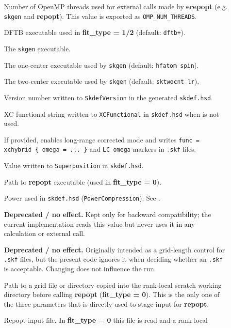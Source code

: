 \begin{description}
\item[] Number of OpenMP threads used for external calls made by \textbf{erepopt}
(e.g. \texttt{skgen} and \textbf{repopt}). This value is exported as \texttt{OMP\_NUM\_THREADS}.
\item[] DFTB executable used in \textbf{fit\_type = 1/2} (default: \texttt{dftb+}).
\item[] The \texttt{skgen} executable.
\item[] The one-center executable used by \texttt{skgen} (default: \texttt{hfatom\_spin}).
\item[] The two-center executable used by \texttt{skgen} (default: \texttt{sktwocnt\_lr}).
\item[] Version number written to \texttt{SkdefVersion} in the generated \texttt{skdef.hsd}.
\item[] XC functional string written to \texttt{XCFunctional} in \texttt{skdef.hsd} when  is not used.
\item[] If provided, enables long-range corrected mode and writes
\texttt{func = xchybrid \{ omega = ... \}} and \texttt{LC omega} markers in \texttt{.skf} files.
\item[] Value written to \texttt{Superposition} in \texttt{skdef.hsd}.
\item[] Path to \textbf{repopt} executable (used in \textbf{fit\_type = 0}).
\item[] Power used in \texttt{skdef.hsd} (\texttt{PowerCompression}). See .
\item[] \textbf{Deprecated / no effect.} Kept only for backward compatibility; the current implementation
reads this value but never uses it in any calculation or external call.
\item[] \textbf{Deprecated / no effect.} Originally intended as a grid-length control for \texttt{.skf}
files, but the present code ignores it when deciding whether an \texttt{.skf} is acceptable. Changing 
does not influence the run.
\item[] Path to a grid file or directory copied into the rank-local scratch working directory before calling
\textbf{repopt} (\textbf{fit\_type = 0}). This is the only one of the three parameters that is directly used to stage
input for \textbf{repopt}.
\item[] Repopt input file. In \textbf{fit\_type = 0} this file is read and a rank-local

\end{description}
